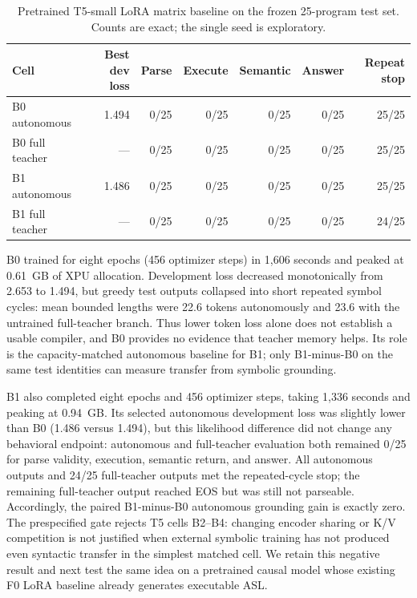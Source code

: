 \documentclass[11pt]{article}
\begin{document}
\begin{table}[t]
\centering\small
\caption{Pretrained T5-small LoRA matrix baseline on the frozen 25-program
test set. Counts are exact; the single seed is exploratory.}
\label{tab:asl-matrix-t5}
\begin{tabular}{lrrrrrr}
\toprule
Cell & Best dev loss & Parse & Execute & Semantic & Answer & Repeat stop\\
\midrule
B0 autonomous & 1.494 & 0/25 & 0/25 & 0/25 & 0/25 & 25/25\\
B0 full teacher & --- & 0/25 & 0/25 & 0/25 & 0/25 & 25/25\\
B1 autonomous & 1.486 & 0/25 & 0/25 & 0/25 & 0/25 & 25/25\\
B1 full teacher & --- & 0/25 & 0/25 & 0/25 & 0/25 & 24/25\\
\bottomrule
\end{tabular}
\end{table}

B0 trained for eight epochs (456 optimizer steps) in 1,606 seconds and peaked
at 0.61~GB of XPU allocation. Development loss decreased monotonically from
2.653 to 1.494, but greedy test outputs collapsed into short repeated symbol
cycles: mean bounded lengths were 22.6 tokens autonomously and 23.6 with the
untrained full-teacher branch. Thus lower token loss alone does not establish a
usable compiler, and B0 provides no evidence that teacher memory helps. Its
role is the capacity-matched autonomous baseline for B1; only B1-minus-B0 on
the same test identities can measure transfer from symbolic grounding.

B1 also completed eight epochs and 456 optimizer steps, taking 1,336 seconds
and peaking at 0.94~GB. Its selected autonomous development loss was slightly
lower than B0 (1.486 versus 1.494), but this likelihood difference did not
change any behavioral endpoint: autonomous and full-teacher evaluation both
remained 0/25 for parse validity, execution, semantic return, and answer. All
autonomous outputs and 24/25 full-teacher outputs met the repeated-cycle stop;
the remaining full-teacher output reached EOS but was still not parseable.
Accordingly, the paired B1-minus-B0 autonomous grounding gain is exactly zero.
The prespecified gate rejects T5 cells B2--B4: changing encoder sharing or K/V
competition is not justified when external symbolic training has not produced
even syntactic transfer in the simplest matched cell. We retain this negative
result and next test the same idea on a pretrained causal model whose existing
F0 LoRA baseline already generates executable ASL.
\end{document}
